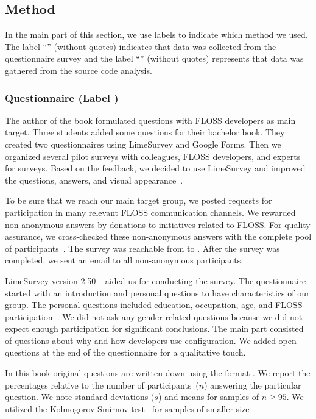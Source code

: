 \subsection{Method}
\label{sec:motivation-method}

In the main part of this section, we use labels to indicate which method we used.
The label ``\methodQuestion{}'' (without quotes) indicates that data was collected from the questionnaire survey and the label ``\methodSource{}'' (without quotes) represents that data was gathered from the source code analysis.

\subsubsection{Questionnaire (Label \methodQuestion{})}

The author of the book formulated questions with FLOSS developers as main target.
Three students added some questions for their bachelor book.
They created two questionnaires using LimeSurvey and Google Forms.
Then we organized several pilot surveys with colleagues, FLOSS developers, and experts for surveys.
Based on the feedback, we decided to use LimeSurvey and improved the questions, answers, and visual appearance~\cite{raab2017challenges}.

To be sure that we reach our main target group, we posted requests for participation in many relevant FLOSS communication channels.
We rewarded non-anonymous answers by donations to initiatives related to FLOSS.
For quality assurance, we cross-checked these non-anonymous answers with the complete pool of participants~\cite{raab2017challenges}.
The survey was reachable from  to .
After the survey was completed, we sent an email to all non-anonymous participants.

LimeSurvey version 2.50+ aided us for conducting the survey.
The questionnaire started with an introduction and personal questions to have characteristics of our group.
The personal questions included education, occupation, age, and FLOSS participation~\cite{raab2017challenges}.
We did not ask any gender-related questions because we did not expect enough participation for significant conclusions.
The main part consisted of questions about why and how developers use configuration.
We added open questions at the end of the questionnaire for a qualitative touch.

In this book original questions are written down using the format .
We report the percentages relative to the number of participants~($n$) answering the particular question.
We note standard deviations ($s$) and means for samples of $n\geq95$.
We utilized the Kolmogorov-Smirnov test~\cite{lilliefors1967kolmogorov} for samples of smaller size~\cite{raab2017challenges}.

